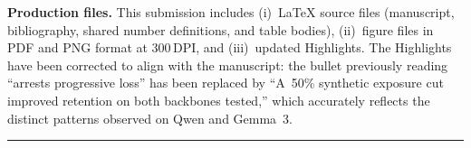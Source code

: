 \documentclass[11pt,a4paper]{article}
\begin{document}
\medskip
\noindent\textbf{Production files.} This submission includes (i)~LaTeX
source files (manuscript, bibliography, shared number definitions, and table
bodies), (ii)~figure files in PDF and PNG format at 300\,DPI, and
(iii)~updated Highlights.
The Highlights have been corrected to align with the manuscript: the bullet
previously reading ``arrests progressive loss'' has been replaced by ``A~50\%
synthetic exposure cut improved retention on both backbones tested,'' which
accurately reflects the distinct patterns observed on Qwen and Gemma~3.

\medskip\noindent\rule{\linewidth}{0.4pt}



\end{document}
